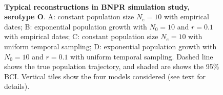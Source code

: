 \documentclass[a4paper,10pt]{article}
\begin{document}
\begin{center}
\begin{figure}[H]
\begin{center}
\\
\end{center}
\caption{\textbf{Typical reconstructions in BNPR simulation study, serotype O}.
A: constant population size $N_e = 10$ with empirical dates; B: exponential population growth with $N_0 = 10$ and $r = 0.1$ with empirical dates; C: constant population size $N_e = 10$ with uniform temporal sampling; D: exponential population growth with $N_0 = 10$ and $r = 0.1$ with uniform temporal sampling.
Dashed line shows the true population trajectory, and shaded are shows the 95\% BCI.
Vertical tiles show the four models considered (see text for details).
}
\label{sfig:reconplots_O}
\end{figure}
\end{center}
\newpage
\end{document}
